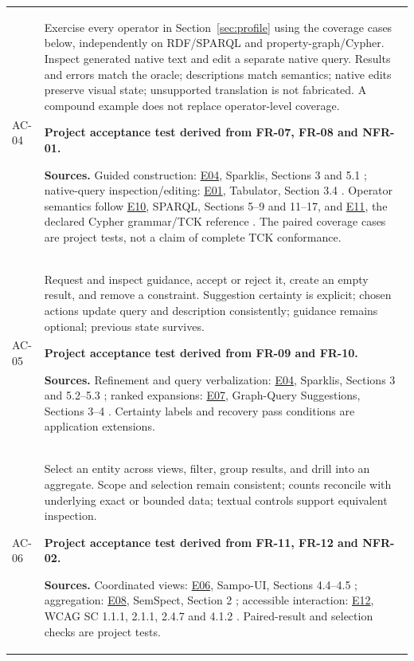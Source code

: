 \documentclass[11pt,a4paper]{article}
\newcommand{\evidence}[1]{\hyperlink{evidence:#1}{#1}}
\begin{document}
{\begin{longtable}{@{}P{1.35cm}P{14.35cm}@{}}
AC-04 & Exercise every operator in Section~\ref{sec:profile} using the coverage cases below, independently on RDF/SPARQL and property-graph/Cypher. Inspect generated native text and edit a separate native query. Results and errors match the oracle; descriptions match semantics; native edits preserve visual state; unsupported translation is not fabricated. A compound example does not replace operator-level coverage.\par\smallskip \textbf{Project acceptance test derived from FR-07, FR-08 and NFR-01.}\par\smallskip \textbf{Sources.} Guided construction: \evidence{E04}, Sparklis, Sections 3 and 5.1 \citep{sparklis}; native-query inspection/editing: \evidence{E01}, Tabulator, Section 3.4 \citep{tabulator}. Operator semantics follow \evidence{E10}, SPARQL, Sections 5--9 and 11--17, and \evidence{E11}, the declared Cypher grammar/TCK reference \citep{sparql,opencypher}. The paired coverage cases are project tests, not a claim of complete TCK conformance.\\
AC-05 & Request and inspect guidance, accept or reject it, create an empty result, and remove a constraint. Suggestion certainty is explicit; chosen actions update query and description consistently; guidance remains optional; previous state survives.\par\smallskip \textbf{Project acceptance test derived from FR-09 and FR-10.}\par\smallskip \textbf{Sources.} Refinement and query verbalization: \evidence{E04}, Sparklis, Sections 3 and 5.2--5.3 \citep{sparklis}; ranked expansions: \evidence{E07}, Graph-Query Suggestions, Sections 3--4 \citep{suggestions}. Certainty labels and recovery pass conditions are application extensions.\\
AC-06 & Select an entity across views, filter, group results, and drill into an aggregate. Scope and selection remain consistent; counts reconcile with underlying exact or bounded data; textual controls support equivalent inspection.\par\smallskip \textbf{Project acceptance test derived from FR-11, FR-12 and NFR-02.}\par\smallskip \textbf{Sources.} Coordinated views: \evidence{E06}, Sampo-UI, Sections 4.4--4.5 \citep{sampoui}; aggregation: \evidence{E08}, SemSpect, Section 2 \citep{semspect}; accessible interaction: \evidence{E12}, WCAG SC 1.1.1, 2.1.1, 2.4.7 and 4.1.2 \citep{wcag}. Paired-result and selection checks are project tests.\\

\end{longtable}}
\end{document}
